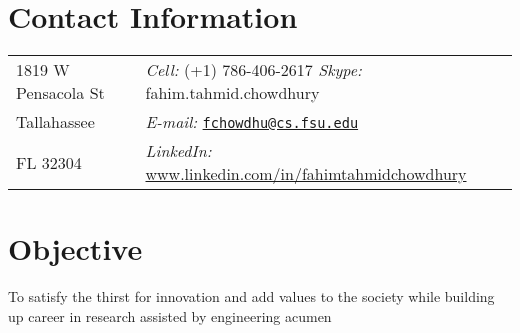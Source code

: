 \documentclass[margin,line]{res}
\begin{document}

\begin{resume}

\section{\sc Contact Information}
\begin{tabular}{@{}p{2in}p{4in}}
1819 W Pensacola St & {\it Cell:}  (+1) 786-406-2617 {\it Skype:}    fahim.tahmid.chowdhury\\            
Tallahassee & {\it E-mail:} \href{mailto:fchowdhu@cs.fsu.edu}{\nolinkurl{fchowdhu@cs.fsu.edu} } \\
FL 32304 & {\it LinkedIn:} \url{www.linkedin.com/in/fahimtahmidchowdhury} \\
\end{tabular}

\vspace*{-.1in}

\section{\sc Objective}
To satisfy the thirst for innovation and add values to the society while building up career in research assisted by engineering acumen

\vspace*{-.1in}


\end{resume}
\end{document}
